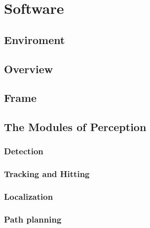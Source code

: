 \section{Software}
\subsection{Enviroment}
\subsection{Overview}
\subsection{Frame}
\subsection{The Modules of Perception}
	\subsubsection{Detection}
	\subsubsection{Tracking and Hitting}
	\subsubsection{Localization}
	\subsubsection{Path planning}
\pagebreak